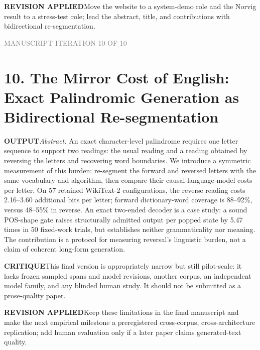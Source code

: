 \documentclass[10pt]{article}
\newcommand{\outputlabel}{\textcolor{teal!65!black}{\textbf{OUTPUT}}}
\newcommand{\critiquelabel}{\textcolor{red!65!black}{\textbf{CRITIQUE}}}
\newcommand{\reviselabel}{\textcolor{blue!65!black}{\textbf{REVISION APPLIED}}}
\newcommand{\pass}[1]{\textcolor{gray}{\small MANUSCRIPT ITERATION #1 OF 10}}
\begin{document}
\reviselabel\quad Move the website to a system-demo role and the Norvig result to a stress-test role; lead the abstract, title, and contributions with bidirectional re-segmentation.

\newpage
\pass{10}
\section*{10. The Mirror Cost of English: Exact Palindromic Generation as Bidirectional Re-segmentation}
\outputlabel\quad \emph{Abstract.} An exact character-level palindrome requires one letter sequence to support two readings: the usual reading and a reading obtained by reversing the letters and recovering word boundaries. We introduce a symmetric measurement of this burden: re-segment the forward and reversed letters with the same vocabulary and algorithm, then compare their causal-language-model costs per letter. On 57 retained WikiText-2 configurations, the reverse reading costs 2.16--3.60 additional bits per letter; forward dictionary-word coverage is 88--92\%, versus 48--55\% in reverse. An exact two-ended decoder is a case study: a sound POS-shape gate raises structurally admitted output per popped state by 5.47 times in 50 fixed-work trials, but establishes neither grammaticality nor meaning. The contribution is a protocol for measuring reversal's linguistic burden, not a claim of coherent long-form generation.

\critiquelabel\quad This final version is appropriately narrow but still pilot-scale: it lacks frozen sampled spans and model revisions, another corpus, an independent model family, and any blinded human study. It should not be submitted as a prose-quality paper.

\reviselabel\quad Keep these limitations in the final manuscript and make the next empirical milestone a preregistered cross-corpus, cross-architecture replication; add human evaluation only if a later paper claims generated-text quality.
\end{document}
